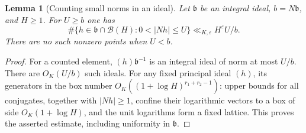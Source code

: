 \documentclass[11pt]{amsart}
\newtheorem{lemma}[theorem]{Lemma}
\theoremstyle{definition}
\numberwithin{equation}{section}
\begin{document}
\begin{lemma}[Counting small norms in an ideal]
\label{lem:g789-smallnorm}
Let $\mathfrak b$ be an integral ideal, $b=N\mathfrak b$, and
$H\ge1$. For $U\ge b$ one has
\[
 \#\{h\in\mathfrak b\cap\mathcal B(H):0<|Nh|\le U\}
       \ll_{K,\varepsilon}H^\varepsilon U/b.
\]
There are no such nonzero points when $U<b$.
\end{lemma}
\begin{proof}
For a counted element, $(h)\mathfrak b^{-1}$ is an integral ideal
of norm at most $U/b$. There are $O_K(U/b)$ such ideals.
For any fixed principal ideal $(h)$, its generators in the box
number $O_K((1+\log H)^{r_1+r_2-1})$: upper bounds for all conjugates,
together with $|Nh|\ge1$, confine their logarithmic vectors to a box
of side $O_K(1+\log H)$, and the unit logarithms form a fixed lattice.
This proves the asserted estimate, including uniformity in
$\mathfrak b$.
\end{proof}
\end{document}
